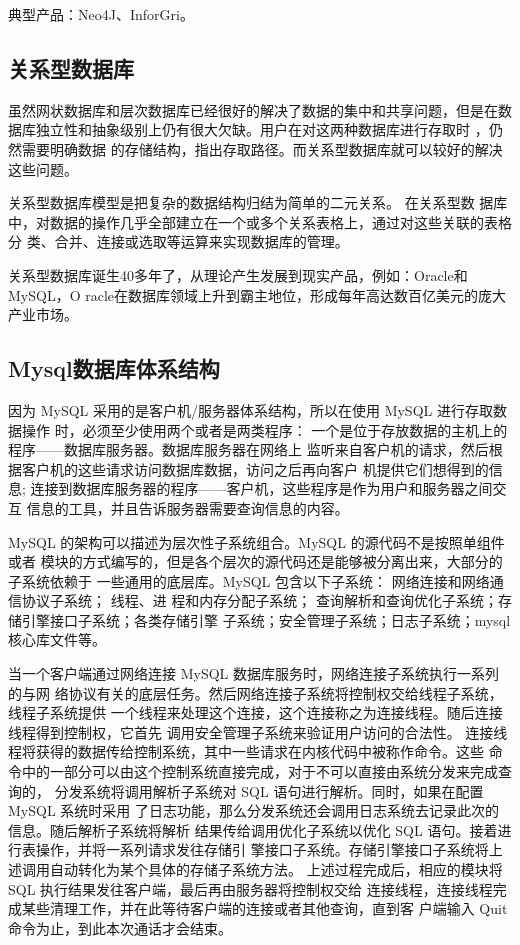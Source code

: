 典型产品：Neo4J、InforGri。
\subsection{关系型数据库}
虽然网状数据库和层次数据库已经很好的解决了数据的集中和共享问题，但是在数
据库独立性和抽象级别上仍有很大欠缺。用户在对这两种数据库进行存取时
，仍然需要明确数据
的存储结构，指出存取路径。而关系型数据库就可以较好的解决这些问题。

关系型数据库模型是把复杂的数据结构归结为简单的二元关系。
在关系型数
据库中，对数据的操作几乎全部建立在一个或多个关系表格上，通过对这些关联的表格分
类、合并、连接或选取等运算来实现数据库的管理。

关系型数据库诞生40多年了，从理论产生发展到现实产品，例如：Oracle和MySQL，O
racle在数据库领域上升到霸主地位，形成每年高达数百亿美元的庞大产业市场。
\subsection{Mysql数据库体系结构}
因为 MySQL 采用的是客户机/服务器体系结构，所以在使用 MySQL 进行存取数据操作
时，必须至少使用两个或者是两类程序：
一个是位于存放数据的主机上的程序——数据库服务器。数据库服务器在网络上
监听来自客户机的请求，然后根据客户机的这些请求访问数据库数据，访问之后再向客户
机提供它们想得到的信息;
连接到数据库服务器的程序——客户机，这些程序是作为用户和服务器之间交互
信息的工具，并且告诉服务器需要查询信息的内容。

MySQL 的架构可以描述为层次性子系统组合。MySQL 的源代码不是按照单组件或者
模块的方式编写的，但是各个层次的源代码还是能够被分离出来，大部分的子系统依赖于
一些通用的底层库。MySQL 包含以下子系统：
网络连接和网络通信协议子系统；
线程、进
程和内存分配子系统；
查询解析和查询优化子系统；存储引擎接口子系统；各类存储引擎
子系统；安全管理子系统；日志子系统；mysql核心库文件等。

当一个客户端通过网络连接 MySQL 数据库服务时，网络连接子系统执行一系列的与网
络协议有关的底层任务。然后网络连接子系统将控制权交给线程子系统，线程子系统提供
一个线程来处理这个连接，这个连接称之为连接线程。随后连接线程得到控制权，它首先
调用安全管理子系统来验证用户访问的合法性。
连接线程将获得的数据传给控制系统，其中一些请求在内核代码中被称作命令。这些
命令中的一部分可以由这个控制系统直接完成，对于不可以直接由系统分发来完成查询的，
分发系统将调用解析子系统对 SQL 语句进行解析。同时，如果在配置 MySQL 系统时采用
了日志功能，那么分发系统还会调用日志系统去记录此次的信息。随后解析子系统将解析
结果传给调用优化子系统以优化 SQL 语句。接着进行表操作，并将一系列请求发往存储引
擎接口子系统。存储引擎接口子系统将上述调用自动转化为某个具体的存储子系统方法。
上述过程完成后，相应的模块将 SQL 执行结果发往客户端，最后再由服务器将控制权交给
连接线程，连接线程完成某些清理工作，并在此等待客户端的连接或者其他查询，直到客
户端输入 Quit 命令为止，到此本次通话才会结束。
